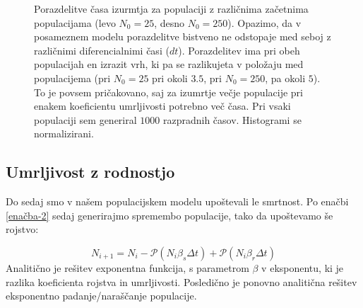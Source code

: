 \documentclass[slovene,11pt,a4paper]{article}
\numberwithin{equation}{section} %
\numberwithin{figure}{section} %
\numberwithin{table}{section} %
\begin{document}
\begin{figure}[h]
\caption{Porazdelitve časa izurmtja za populaciji z različnima začetnima populacijama (levo $N_0=25$, desno $N_0=250$). Opazimo, da v posameznem modelu porazdelitve bistveno ne odstopaje med seboj z različnimi diferencialnimi časi ($dt$). Porazdelitev ima pri obeh populacijah en izrazit vrh, ki pa se razlikujeta v položaju med populacijema (pri $N_0=25$ pri okoli $3.5$, pri $N_0=250$, pa okoli $5$). To je povsem pričakovano, saj za izumrtje večje populacije pri enakem koeficientu umrljivosti potrebno več časa. Pri vsaki populaciji sem generiral $1000$ razpradnih časov. Histogrami se normalizirani.}
\end{figure}

\subsection{Umrljivost z rodnostjo}

Do sedaj smo v našem populacijskem modelu upoštevali le smrtnost. Po enačbi \ref{enačba-2} sedaj generirajmo spremembo populacije, tako da upoštevamo še rojstvo:

\begin{equation}
N_{i+1}=N_i - \mathcal{P}(N_i \beta_s \Delta t) + \mathcal{P}(N_i \beta_r \Delta t)
\label{enačba-3}
\end{equation}
Analitično je rešitev exponentna funkcija, s parametrom $\beta$ v eksponentu, ki je razlika koeficienta rojstva in umrljivosti. Posledično je ponovno analitična rešitev eksponentno padanje/naraščanje populacije.
\end{document}
